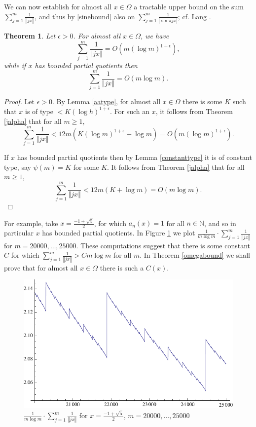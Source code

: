 \documentclass{amsart}
\newcommand{\norm}[1]{\left\Vert #1 \right\Vert}
\newtheorem{theorem}{Theorem}
\begin{document}
We can now establish for almost all $x \in \Omega$ a tractable upper bound on the sum $\sum_{j=1}^m \frac{1}{\norm{jx}}$, and thus
by \eqref{sinebound} also on $\sum_{j=1}^m \frac{1}{|\sin \pi  j x|}$; cf. Lang \cite[p.~44, Theorem 3]{MR0209227}.
 





\begin{theorem}
Let $\epsilon>0$. For almost all $x \in \Omega$, we have
\[
\sum_{j=1}^m \frac{1}{\norm{jx}} = O\left(m \left(\log m\right)^{1+\epsilon}\right),
\]
while if $x$ has bounded partial quotients then
\[
\sum_{j=1}^m \frac{1}{\norm{jx}} = O\left(m \log m \right).
\]
\label{reciprocaltheorem}
\end{theorem}
\begin{proof}
Let $\epsilon>0$. By Lemma \ref{aatype}, for almost all $x \in \Omega$ there is some $K$ such that $x$ is of type $<K(\log h)^{1+\epsilon}$.
For
such an $x$, it follows from Theorem \ref{jalpha} that for all $m \geq 1$,
\[
\sum_{j=1}^m \frac{1}{\norm{jx}} < 12m(K(\log m)^{1+\epsilon}+\log m)=O\left(m \left(\log m\right)^{1+\epsilon}\right).
\]

If $x$ has bounded partial quotients then by Lemma \ref{constanttype} it is of constant type, say $\psi(m)=K$ for some $K$. It follows from Theorem \ref{jalpha} that for all $m \geq 1$,
\[
\sum_{j=1}^m \frac{1}{\norm{jx}} < 12m(K+\log m)=O\left(m \log m \right).
\]
\end{proof}


For example, take $x=\frac{-1+\sqrt{5}}{2}$,
for which $a_n(x)=1$ for all $n \in \mathbb{N}$, and so in particular $x$ has bounded partial quotients.
In
 Figure \ref{20000-25000} we plot $\frac{1}{m \log m} \cdot \sum_{j=1}^m \frac{1}{\norm{jx}}$ for $m=20000,\ldots,25000$.  
 These computations suggest that there is some constant $C$ for which $\sum_{j=1}^m \frac{1}{\norm{jx}} > C m \log m$ for all $m$.
 In Theorem \ref{omegabound} we shall prove that for almost all $x \in \Omega$ there is such a $C(x)$.

\begin{figure}
\includegraphics[scale=0.80]{20000-25000}
\caption{$\frac{1}{m\log m} \cdot \sum_{j=1}^m \frac{1}{\norm{jx}}$ for $x=\frac{-1+\sqrt{5}}{2}$, $m=20000,\ldots,25000$}
\label{20000-25000}
\end{figure}
\end{document}

